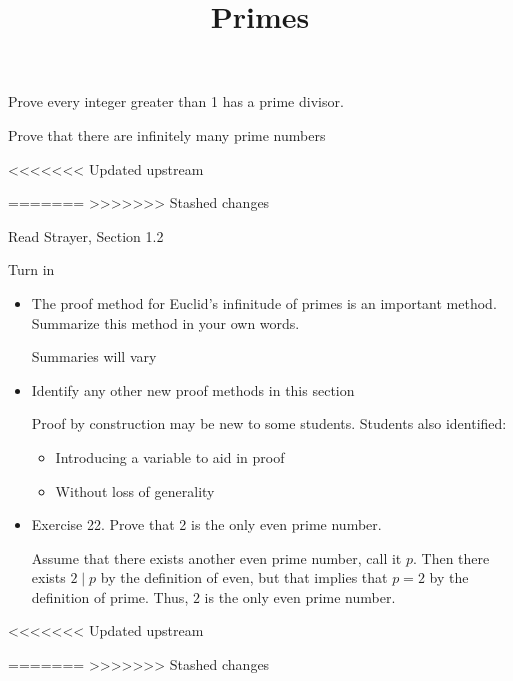 \documentclass{ximera}
\title{Primes}
\begin{document}
\begin{abstract}
\end{abstract}
\maketitle


\begin{obj}
\item  Prove every integer greater than 1 has a prime divisor.
\item  Prove that there are infinitely many prime numbers
\end{obj}


<<<<<<< Updated upstream
\begin{instructorNotes}

=======
>>>>>>> Stashed changes
\begin{pre}
 \item[Read] Strayer, Section 1.2
 \item[Turn in] 
\begin{itemize}
 \item The proof method for Euclid's infinitude of primes is an important method. Summarize this method in your own words.
 
\begin{solution}
 Summaries will vary
\end{solution}
 \item Identify any other new proof methods in this section
 
\begin{solution}
 Proof by construction may be new to some students. Students also identified: 
\begin{itemize}
 \item Introducing a variable to aid in proof
 \item Without loss of generality
 
\end{itemize}
\end{solution}
 \item Exercise 22. Prove that 2 is the only even prime number.
 
\begin{solution}
 Assume that there exists another even prime number, call it $p$. Then there exists $2\mid p$ by the definition of even, but that implies that $p=2$ by the definition of prime. Thus, $2$ is the only even prime number.
\end{solution}
\end{itemize}
\end{pre}
  
<<<<<<< Updated upstream
\end{instructorNotes}
=======
>>>>>>> Stashed changes
\end{document}
